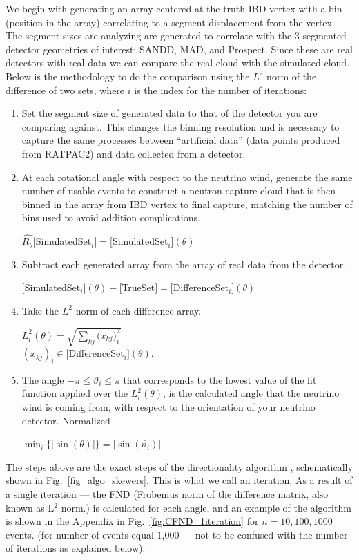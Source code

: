 \documentclass[tightenlines,twocolumn,prl,notitlepage,nofootinbib,preprintnumbers,longbibliography]{revtex4-1}
\begin{document}
We begin with generating an array centered at the truth IBD vertex with a bin (position in the array) correlating to a segment displacement from the vertex. The segment sizes are analyzing are generated to correlate with the 3  segmented detector geometries of interest: SANDD, MAD,  and Prospect. Since these are real detectors with real data we can compare the real cloud with the simulated cloud. Below is the methodology to do the comparison using the $L^2$ norm of the difference of two sets, where $i$ is the index for the number of iterations:
\begin{enumerate}
    \item Set the segment size of generated data to that of the detector you are comparing against. This changes the binning resolution and is necessary to capture the same processes between ``artificial data'' (data points produced from RATPAC2) and data collected from a detector.
    \item At each rotational angle with respect to the neutrino wind, generate the same number of usable events to construct a neutron capture cloud that is then binned in the array from IBD vertex to final capture, matching the number of bins used to avoid addition complications. 
    
    $\hat{R_{\theta}}[$SimulatedSet$_i] = [$SimulatedSet$_i](\theta) $
    \item Subtract each generated array from the array of real data from the detector.

     $[$SimulatedSet$_i](\theta) - [$TrueSet$] = [$DifferenceSet$_i](\theta)$
    \item Take the $L^2$ norm of each difference array. 
    
    $L^2_i(\theta) = \sqrt{\sum_{kj}({x_{kj})_i^2}} $\\$ (x_{kj})_i \in [$DifferenceSet$_i](\theta)$.
    
    \item The angle $-\pi \leq\vartheta_i\leq\pi$ that corresponds to the lowest value of the fit function applied over the $L_i^2(\theta)$, is the calculated angle that the neutrino wind is coming from, with respect to the orientation of your neutrino detector. Normalized
    
    $\min_i\{|\sin{(\theta)}|\} = |\sin{(\vartheta_i)}|$

\end{enumerate}

The steps above are the exact steps of the directionality algorithm \cite{10.1063/5.0315079}, schematically shown in Fig.~\ref{fig_algo_skewers}. This is what we call an iteration. As a result of a single iteration --- the FND (Frobenius norm of the difference matrix, also known as L$^2$ norm.) is calculated for each angle, and an example of the algorithm is shown in the Appendix in Fig.~\ref{fig:CFND_1iteration} for $n=10,100,1000$ events. (for number of events equal 1,000 --- not to be confused with the number of iterations as explained below).
\end{document}
